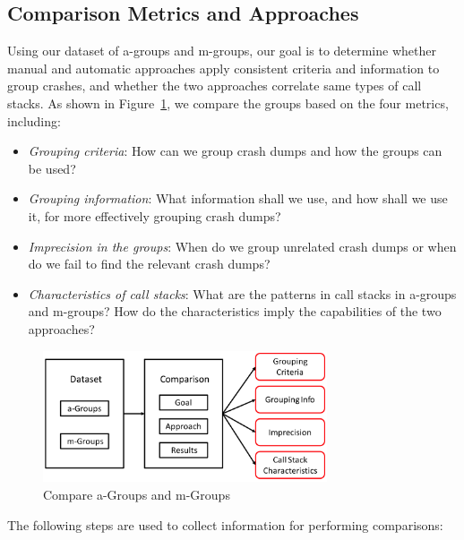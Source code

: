 \documentclass{llncs}
\begin{document}
\subsection{Comparison Metrics and Approaches}
Using our dataset of a-groups and m-groups, our goal is to determine whether manual and automatic approaches apply consistent criteria and information to group crashes, and whether the two approaches correlate same types of call stacks. As shown in Figure~\ref{fig:approach}, we compare the groups based on the four metrics, including:
\begin{itemize}
\item {\it Grouping criteria}: How can we group crash dumps and how the groups can be used?
\item {\it Grouping information}: What information shall we use, and how shall we use it, for more effectively grouping crash dumps?
\item {\it Imprecision in the groups}: When do we group unrelated crash dumps or when do we fail to find the relevant crash dumps?
\item {\it Characteristics of call stacks}: What are the patterns in call stacks in a-groups and m-groups? How do the characteristics imply the capabilities of the two approaches?
\end{itemize}


\begin{figure}[!htb]
\centering
\includegraphics[width = 8.4cm, angle = 0]{images/approach2.png}
\caption{Compare a-Groups and m-Groups~\label{fig:approach}}
\normalsize
\end{figure}


The following steps are used to collect information for performing comparisons:

%
\end{document}
